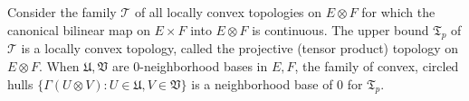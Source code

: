 Consider the family $\mathcal{T}$ of all locally convex topologies on $E \otimes F$ for which the canonical bilinear map on $E \times F$ into $E \otimes F$ is continuous. The upper bound $\mathfrak{T}_p$ of $\mathcal{T}$ is a locally convex topology, called the projective (tensor product) topology on $E \otimes F$. When $\mathfrak{U}, \mathfrak{V}$ are 0-neighborhood bases in $E, F$, the family of convex, circled hulls $\{\Gamma(U \otimes V): U \in \mathfrak{U}, V \in \mathfrak{V}\}$ is a neighborhood base of 0 for $\mathfrak{T}_p$.

